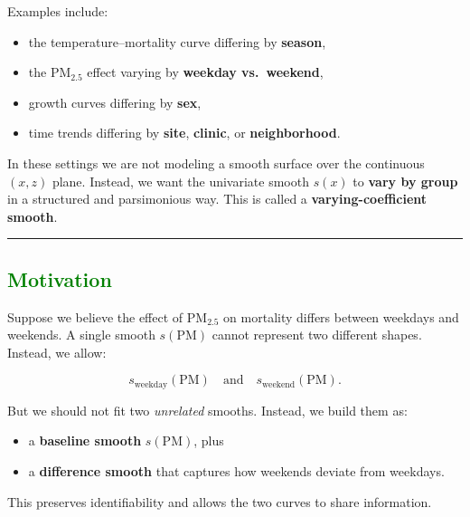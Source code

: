 \documentclass[
  letterpaper,
  DIV=11,
  numbers=noendperiod]{scrreprt}
\providecommand{\tightlist}{%
  \setlength{\itemsep}{0pt}\setlength{\parskip}{0pt}}\usepackage{longtable,booktabs,array}
\begin{document}
Examples include:

\begin{itemize}
\tightlist
\item
  the temperature--mortality curve differing by \textbf{season},\\
\item
  the PM\(_{2.5}\) effect varying by \textbf{weekday vs.~weekend},\\
\item
  growth curves differing by \textbf{sex},\\
\item
  time trends differing by \textbf{site}, \textbf{clinic}, or
  \textbf{neighborhood}.
\end{itemize}

In these settings we are not modeling a smooth surface over the
continuous \((x,z)\) plane. Instead, we want the univariate smooth
\(s(x)\) to \textbf{vary by group} in a structured and parsimonious way.
This is called a \textbf{varying-coefficient smooth}.

\begin{center}\rule{0.5\linewidth}{0.5pt}\end{center}

\hypertarget{section-36}{%
\subsection*{\texorpdfstring{\textcolor{green}{Motivation}}{}}\label{section-36}}

Suppose we believe the effect of PM\(_{2.5}\) on mortality differs
between weekdays and weekends. A single smooth \(s(\text{PM})\) cannot
represent two different shapes. Instead, we allow:

\[
s_{\text{weekday}}(\text{PM}) \quad\text{and}\quad
s_{\text{weekend}}(\text{PM}).
\]

But we should not fit two \emph{unrelated} smooths. Instead, we build
them as:

\begin{itemize}
\tightlist
\item
  a \textbf{baseline smooth} \(s(\text{PM})\), plus\\
\item
  a \textbf{difference smooth} that captures how weekends deviate from
  weekdays.
\end{itemize}

This preserves identifiability and allows the two curves to share
information.
\end{document}
